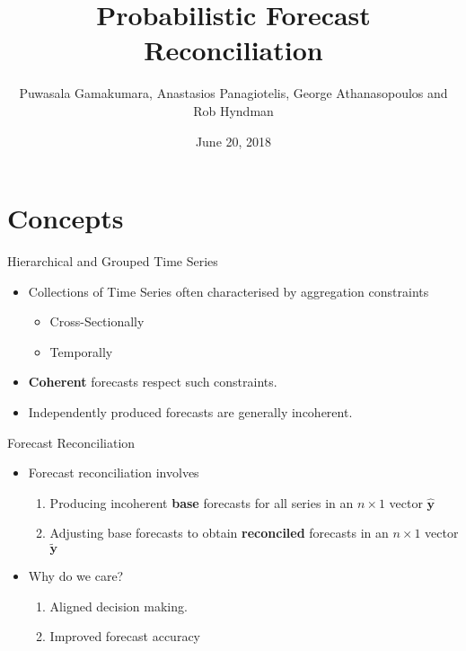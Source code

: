 \documentclass{beamer}
\title{Probabilistic Forecast Reconciliation}
\date{June 20, 2018}
\author[GPAH]{Puwasala Gamakumara, Anastasios Panagiotelis, George Athanasopoulos and Rob Hyndman}
\begin{document}
  \begin{frame}
    \maketitle
  \end{frame}
  \section{Concepts}
  \begin{frame}{Hierarchical and Grouped Time Series}
  	\begin{itemize}
  	  \item Collections of Time Series often characterised by aggregation constraints
  	  \begin{itemize}
  	    \item Cross-Sectionally
  		\item Temporally
  	  \end{itemize}
      \item {\bf Coherent} forecasts respect such constraints. 
      \item Independently produced forecasts are generally incoherent.
  \end{itemize}
\begin{figure}
	\begin{center}
		  
		 
		\qobitree
	\end{center}
\end{figure}
\end{frame}  
  \begin{frame}{Forecast Reconciliation}
  	\begin{itemize}
  	  \item Forecast reconciliation involves
  	  \begin{enumerate}
  	  	\item Producing incoherent {\bf base} forecasts for all series in an $n\times 1$ vector $\hat{\bm y}$
        \item Adjusting base forecasts to obtain {\bf reconciled} forecasts in an $n\times 1$ vector $\tilde{\bm y}$
  	  \end{enumerate} 
      \item Why do we care?
        \begin{enumerate}
        	\item Aligned decision making.
        	\item Improved forecast accuracy
        \end{enumerate}
  	\end{itemize}
  \end{frame}
\end{document}
